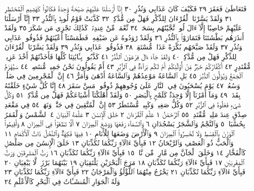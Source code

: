 فَتَعَاطَىٰ فَعَقَرَ ٢٩ فَكَيْفَ كَانَ عَذَابِي وَنُذُرِ ٣٠ إِنَّآ أَرْسَلْنَا عَلَيْهِمْ
صَيْحَةࣰ وَٰحِدَةࣰ فَكَانُوا۟ كَهَشِيمِ ٱلْمُحْتَظِرِ ٣١ وَلَقَدْ يَسَّرْنَا ٱلْقُرْءَانَ
لِلذِّكْرِ فَهَلْ مِن مُّدَّكِرࣲ ٣٢ كَذَّبَتْ قَوْمُ لُوطِۭ بِٱلنُّذُرِ ٣٣ إِنَّآ أَرْسَلْنَا
عَلَيْهِمْ حَاصِبًا إِلَّآ ءَالَ لُوطࣲۖ نَّجَّيْنَٰهُم بِسَحَرࣲ ٣٤ نِّعْمَةࣰ مِّنْ عِندِنَاۚ
كَذَٰلِكَ نَجْزِي مَن شَكَرَ ٣٥ وَلَقَدْ أَنذَرَهُم بَطْشَتَنَا فَتَمَارَوْا۟
بِٱلنُّذُرِ ٣٦ وَلَقَدْ رَٰوَدُوهُ عَن ضَيْفِهِۦ فَطَمَسْنَآ أَعْيُنَهُمْ فَذُوقُوا۟
عَذَابِي وَنُذُرِ ٣٧ وَلَقَدْ صَبَّحَهُم بُكْرَةً عَذَابࣱ مُّسْتَقِرࣱّ ٣٨ فَذُوقُوا۟
عَذَابِي وَنُذُرِ ٣٩ وَلَقَدْ يَسَّرْنَا ٱلْقُرْءَانَ لِلذِّكْرِ فَهَلْ مِن مُّدَّكِرࣲ ٤٠
وَلَقَدْ جَآءَ ءَالَ فِرْعَوْنَ ٱلنُّذُرُ ٤١ كَذَّبُوا۟ بِـَٔايَٰتِنَا كُلِّهَا فَأَخَذْنَٰهُمْ
أَخْذَ عَزِيزࣲ مُّقْتَدِرٍ ٤٢ أَكُفَّارُكُمْ خَيْرࣱ مِّنْ أُو۟لَٰٓئِكُمْ أَمْ لَكُم بَرَآءَةࣱ
فِي ٱلزُّبُرِ ٤٣ أَمْ يَقُولُونَ نَحْنُ جَمِيعࣱ مُّنتَصِرࣱ ٤٤ سَيُهْزَمُ ٱلْجَمْعُ
وَيُوَلُّونَ ٱلدُّبُرَ ٤٥ بَلِ ٱلسَّاعَةُ مَوْعِدُهُمْ وَٱلسَّاعَةُ أَدْهَىٰ وَأَمَرُّ ٤٦
إِنَّ ٱلْمُجْرِمِينَ فِي ضَلَٰلࣲ وَسُعُرࣲ ٤٧ يَوْمَ يُسْحَبُونَ فِي ٱلنَّارِ عَلَىٰ
وُجُوهِهِمْ ذُوقُوا۟ مَسَّ سَقَرَ ٤٨ إِنَّا كُلَّ شَيْءٍ خَلَقْنَٰهُ بِقَدَرࣲ ٤٩
وَمَآ أَمْرُنَآ إِلَّا وَٰحِدَةࣱ كَلَمْحِۭ بِٱلْبَصَرِ ٥٠ وَلَقَدْ أَهْلَكْنَآ
أَشْيَاعَكُمْ فَهَلْ مِن مُّدَّكِرࣲ ٥١ وَكُلُّ شَيْءࣲ فَعَلُوهُ فِي ٱلزُّبُرِ ٥٢
وَكُلُّ صَغِيرࣲ وَكَبِيرࣲ مُّسْتَطَرٌ ٥٣ إِنَّ ٱلْمُتَّقِينَ فِي
جَنَّٰتࣲ وَنَهَرࣲ ٥٤ فِي مَقْعَدِ صِدْقٍ عِندَ مَلِيكࣲ مُّقْتَدِرِۭ ٥٥
ٱلرَّحْمَٰنُ ١ عَلَّمَ ٱلْقُرْءَانَ ٢ خَلَقَ ٱلْإِنسَٰنَ ٣ عَلَّمَهُ ٱلْبَيَانَ ٤
ٱلشَّمْسُ وَٱلْقَمَرُ بِحُسْبَانࣲ ٥ وَٱلنَّجْمُ وَٱلشَّجَرُ يَسْجُدَانِ ٦
وَٱلسَّمَآءَ رَفَعَهَا وَوَضَعَ ٱلْمِيزَانَ ٧ أَلَّا تَطْغَوْا۟ فِي ٱلْمِيزَانِ ٨
وَأَقِيمُوا۟ ٱلْوَزْنَ بِٱلْقِسْطِ وَلَا تُخْسِرُوا۟ ٱلْمِيزَانَ ٩ وَٱلْأَرْضَ
وَضَعَهَا لِلْأَنَامِ ١٠ فِيهَا فَٰكِهَةࣱ وَٱلنَّخْلُ ذَاتُ ٱلْأَكْمَامِ ١١
وَٱلْحَبُّ ذُو ٱلْعَصْفِ وَٱلرَّيْحَانُ ١٢ فَبِأَيِّ ءَالَآءِ رَبِّكُمَا تُكَذِّبَانِ ١٣
خَلَقَ ٱلْإِنسَٰنَ مِن صَلْصَٰلࣲ كَٱلْفَخَّارِ ١٤ وَخَلَقَ ٱلْجَآنَّ مِن
مَّارِجࣲ مِّن نَّارࣲ ١٥ فَبِأَيِّ ءَالَآءِ رَبِّكُمَا تُكَذِّبَانِ ١٦ رَبُّ
ٱلْمَشْرِقَيْنِ وَرَبُّ ٱلْمَغْرِبَيْنِ ١٧ فَبِأَيِّ ءَالَآءِ رَبِّكُمَا تُكَذِّبَانِ ١٨
مَرَجَ ٱلْبَحْرَيْنِ يَلْتَقِيَانِ ١٩ بَيْنَهُمَا بَرْزَخࣱ لَّا يَبْغِيَانِ ٢٠ فَبِأَيِّ ءَالَآءِ
رَبِّكُمَا تُكَذِّبَانِ ٢١ يَخْرُجُ مِنْهُمَا ٱللُّؤْلُؤُ وَٱلْمَرْجَانُ ٢٢ فَبِأَيِّ ءَالَآءِ
رَبِّكُمَا تُكَذِّبَانِ ٢٣ وَلَهُ ٱلْجَوَارِ ٱلْمُنشَـَٔاتُ فِي ٱلْبَحْرِ كَٱلْأَعْلَٰمِ ٢٤
